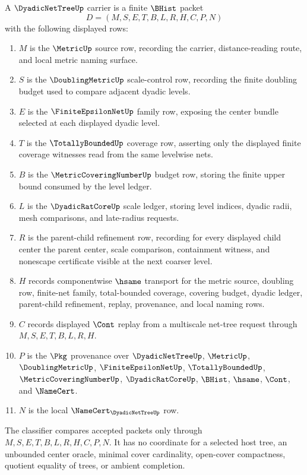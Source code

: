 \begin{definition}
\label{def:dyadic-net-tree-carrier}
A $\DyadicNetTreeUp$ carrier is a finite $\BHist$ packet
$$
D=(M,S,E,T,B,L,R,H,C,P,N)
$$
with the following displayed rows:
\begin{enumerate}
\item $M$ is the $\MetricUp$ source row, recording the carrier, distance-reading route, and local metric naming surface.
\item $S$ is the $\DoublingMetricUp$ scale-control row, recording the finite doubling budget used to compare adjacent dyadic levels.
\item $E$ is the $\FiniteEpsilonNetUp$ family row, exposing the center bundle selected at each displayed dyadic level.
\item $T$ is the $\TotallyBoundedUp$ coverage row, asserting only the displayed finite coverage witnesses read from the same levelwise nets.
\item $B$ is the $\MetricCoveringNumberUp$ budget row, storing the finite upper bound consumed by the level ledger.
\item $L$ is the $\DyadicRatCoreUp$ scale ledger, storing level indices, dyadic radii, mesh comparisons, and late-radius requests.
\item $R$ is the parent-child refinement row, recording for every displayed child center the parent center, scale comparison, containment witness, and nonescape certificate visible at the next coarser level.
\item $H$ records componentwise $\hsame$ transport for the metric source, doubling row, finite-net family, total-bounded coverage, covering budget, dyadic ledger, parent-child refinement, replay, provenance, and local naming rows.
\item $C$ records displayed $\Cont$ replay from a multiscale net-tree request through $M,S,E,T,B,L,R,H$.
\item $P$ is the $\Pkg$ provenance over $\DyadicNetTreeUp$, $\MetricUp$, $\DoublingMetricUp$, $\FiniteEpsilonNetUp$, $\TotallyBoundedUp$, $\MetricCoveringNumberUp$, $\DyadicRatCoreUp$, $\BHist$, $\hsame$, $\Cont$, and $\NameCert$.
\item $N$ is the local $\NameCert_{\DyadicNetTreeUp}$ row.
\end{enumerate}
The classifier compares accepted packets only through $M,S,E,T,B,L,R,H,C,P,N$. It has no coordinate for a selected host tree, an unbounded center oracle, minimal cover cardinality, open-cover compactness, quotient equality of trees, or ambient completion.
\end{definition}

